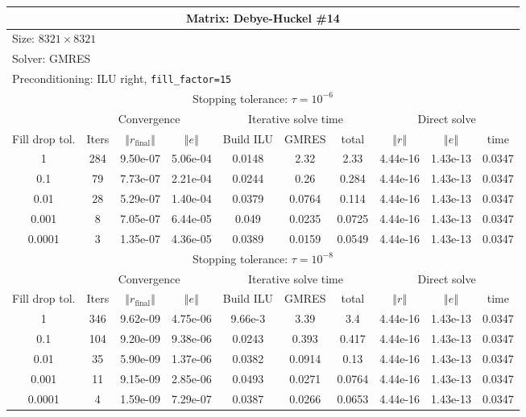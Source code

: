 \documentclass[oneside,final]{amsart}  %
\begin{document}
\begin{tabular}{|c|c|c|c|c|c|c|c|c|c|}
\hline
\multicolumn{10}{|c|}{Matrix: Debye-Huckel \#14}\tabularnewline
\hline
  \multicolumn{10}{|l|}{Size: $8321\times8321$}\tabularnewline
\hline
\multicolumn{10}{|l|}{Solver: GMRES}\tabularnewline
\hline
\multicolumn{10}{|l|}{Preconditioning: ILU right, \texttt{fill\_factor=15}}\tabularnewline
\hline
\hline
\multicolumn{10}{|c|}{Stopping tolerance: $\tau=10^{-6}$}\tabularnewline
\hline
\hline
 & \multicolumn{3}{c|}{Convergence} & \multicolumn{3}{c|}{Iterative solve time} & \multicolumn{3}{c|}{Direct solve}\tabularnewline
\hline
Fill drop tol.  & Iters & $\left\Vert r_{\text{final}}\right\Vert $  & $\left\Vert e\right\Vert $  & Build ILU  & GMRES  & total  & $\left\Vert r\right\Vert $ & $\left\Vert e\right\Vert $  & time\tabularnewline
\hline
1      & 284 & 9.50e-07 & 5.06e-04 &  0.0148 &    2.32 &    2.33 & 4.44e-16 & 1.43e-13 &    0.0347\\
  \hline
0.1    & 79  & 7.73e-07 & 2.21e-04 &  0.0244 &    0.26 &   0.284 & 4.44e-16 & 1.43e-13 &    0.0347\\
  \hline
0.01   & 28  & 5.29e-07 & 1.40e-04 &  0.0379 &  0.0764 &   0.114 & 4.44e-16 & 1.43e-13 &    0.0347\\
  \hline
0.001  & 8   & 7.05e-07 & 6.44e-05 &   0.049 &  0.0235 &  0.0725 & 4.44e-16 & 1.43e-13 &    0.0347\\
  \hline
0.0001 & 3   & 1.35e-07 & 4.36e-05 &  0.0389 &  0.0159 &  0.0549 & 4.44e-16 & 1.43e-13 &    0.0347\\
  \hline
\hline
\multicolumn{10}{|c|}{Stopping tolerance: $\tau=10^{-8}$}\tabularnewline
\hline
\hline
 & \multicolumn{3}{c|}{Convergence} & \multicolumn{3}{c|}{Iterative solve time} & \multicolumn{3}{c|}{Direct solve }\tabularnewline
\hline
Fill drop tol.  & Iters  & $\left\Vert r_{\text{final}}\right\Vert $  & $\left\Vert e\right\Vert $ & Build ILU  & GMRES  & total  & $\left\Vert r\right\Vert $  & $\left\Vert e\right\Vert $  & time\tabularnewline
\hline
1      & 346 & 9.62e-09 & 4.75e-06 & 9.66e-3 &    3.39 &     3.4 & 4.44e-16 & 1.43e-13 &    0.0347\\
  \hline
0.1    & 104 & 9.20e-09 & 9.38e-06 &  0.0243 &   0.393 &   0.417 & 4.44e-16 & 1.43e-13 &    0.0347\\
  \hline
0.01   & 35  & 5.90e-09 & 1.37e-06 &  0.0382 &  0.0914 &    0.13 & 4.44e-16 & 1.43e-13 &    0.0347\\
  \hline
0.001  & 11  & 9.15e-09 & 2.85e-06 &  0.0493 &  0.0271 &  0.0764 & 4.44e-16 & 1.43e-13 &    0.0347\\
  \hline
0.0001 & 4   & 1.59e-09 & 7.29e-07 &  0.0387 &  0.0266 &  0.0653 & 4.44e-16 & 1.43e-13 &    0.0347\\
  \hline
\end{tabular}
\end{document}
